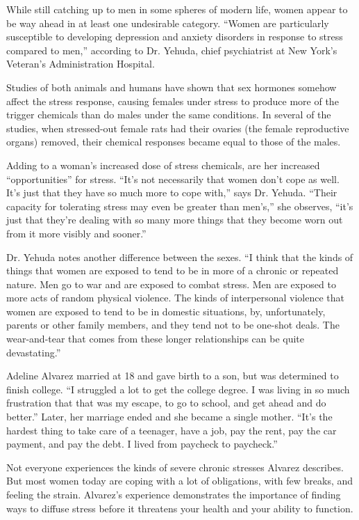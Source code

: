 While still catching up to men in some spheres of modern life, women appear to be way ahead in at least one undesirable category. ``Women are particularly susceptible to developing depression and anxiety disorders in response to stress compared to men,'' according to Dr. Yehuda, chief psychiatrist at New York's Veteran's Administration Hospital.


Studies of both animals and humans have shown that sex hormones somehow affect the stress response, causing females under stress to produce more of the trigger chemicals than do males under the same conditions. In several of the studies, when stressed-out female rats had their ovaries (the female reproductive organs) removed, their chemical responses became equal to those of the males.


Adding to a woman's increased dose of stress chemicals, are her increased ``opportunities'' for stress. ``It's not necessarily that women don't cope as well. It's just that they have so much more to cope with,'' says Dr. Yehuda. ``Their capacity for tolerating stress may even be greater than men's,'' she observes, ``it's just that they're dealing with so many more things that they become worn out from it more visibly and sooner.''


Dr. Yehuda notes another difference between the sexes. ``I think that the kinds of things that women are exposed to tend to be in more of a chronic or repeated nature. Men go to war and are exposed to combat stress. Men are exposed to more acts of random physical violence. The kinds of interpersonal violence that women are exposed to tend to be in domestic situations, by, unfortunately, parents or other family members, and they tend not to be one-shot deals. The wear-and-tear that comes from these longer relationships can be quite devastating.''


Adeline Alvarez married at 18 and gave birth to a son, but was determined to finish college. ``I struggled a lot to get the college degree. I was living in so much frustration that that was my escape, to go to school, and get ahead and do better.'' Later, her marriage ended and she became a single mother. ``It's the hardest thing to take care of a teenager, have a job, pay the rent, pay the car payment, and pay the debt. I lived from paycheck to paycheck.''


Not everyone experiences the kinds of severe chronic stresses Alvarez describes. But most women today are coping with a lot of obligations, with few breaks, and feeling the strain. Alvarez's experience demonstrates the importance of finding ways to diffuse stress before it threatens your health and your ability to function.